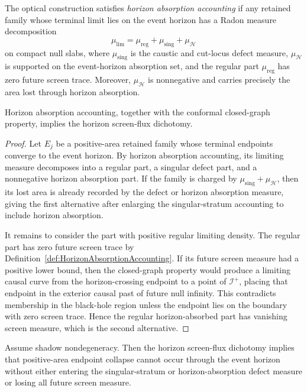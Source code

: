 \begin{definition}\label{def:HorizonAbsorptionAccounting}
The optical construction satisfies \emph{horizon absorption accounting} if any retained family whose terminal limit lies on the event horizon has a Radon measure decomposition
\[
    \mu_{\mathrm{lim}}
    =
    \mu_{\mathrm{reg}}
    +
    \mu_{\mathrm{sing}}
    +
    \mu_{\mathcal H}
\]
on compact null slabs, where $\mu_{\mathrm{sing}}$ is the caustic and cut-locus defect measure, $\mu_{\mathcal H}$ is supported on the event-horizon absorption set, and the regular part $\mu_{\mathrm{reg}}$ has zero future screen trace. Moreover, $\mu_{\mathcal H}$ is nonnegative and carries precisely the area lost through horizon absorption.
\end{definition}

\begin{lemma}\label{lem:HorizonAccountingDichotomy}
Horizon absorption accounting, together with the conformal closed-graph property, implies the horizon screen-flux dichotomy.
\end{lemma}

\begin{proof}
Let $E_j$ be a positive-area retained family whose terminal endpoints converge to the event horizon. By horizon absorption accounting, its limiting measure decomposes into a regular part, a singular defect part, and a nonnegative horizon absorption part. If the family is charged by $\mu_{\mathrm{sing}}+\mu_{\mathcal H}$, then its lost area is already recorded by the defect or horizon absorption measure, giving the first alternative after enlarging the singular-stratum accounting to include horizon absorption.

It remains to consider the part with positive regular limiting density. The regular part has zero future screen trace by Definition~\ref{def:HorizonAbsorptionAccounting}. If its future screen measure had a positive lower bound, then the closed-graph property would produce a limiting causal curve from the horizon-crossing endpoint to a point of $\mathscr I^+$, placing that endpoint in the exterior causal past of future null infinity. This contradicts membership in the black-hole region unless the endpoint lies on the boundary with zero screen trace. Hence the regular horizon-absorbed part has vanishing screen measure, which is the second alternative.
\end{proof}

\begin{lemma}\label{lem:HorizonDichotomyNonabsorption}
Assume shadow nondegeneracy. Then the horizon screen-flux dichotomy implies that positive-area endpoint collapse cannot occur through the event horizon without either entering the singular-stratum or horizon-absorption defect measure or losing all future screen measure.
\end{lemma}

